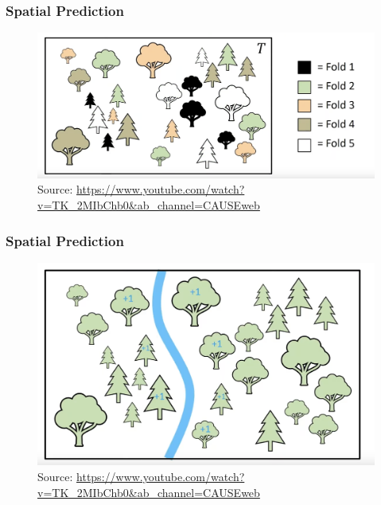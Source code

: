 \documentclass[
  shownotes,
  xcolor={svgnames},
  hyperref={colorlinks,citecolor=DarkBlue,linkcolor=andesred,urlcolor=DarkBlue}
  , aspectratio=169]{beamer}
\begin{document}
\begin{frame}[fragile]
\frametitle{Spatial Prediction}

\begin{figure}[H] \centering
            \captionsetup{justification=centering}
\includegraphics[scale=0.3]{figures/spatial_cross/fig04.png}
\\
\tiny
Source: \url{https://www.youtube.com/watch?v=TK_2MIbChb0&ab_channel=CAUSEweb}
 \end{figure}
\end{frame}

\begin{frame}[fragile]
\frametitle{Spatial Prediction}

\begin{figure}[H] \centering
            \captionsetup{justification=centering}
\includegraphics[scale=0.4]{figures/spatial_cross/fig05.png}
\\
\tiny
Source: \url{https://www.youtube.com/watch?v=TK_2MIbChb0&ab_channel=CAUSEweb}
 \end{figure}
\end{frame}
\end{document}
